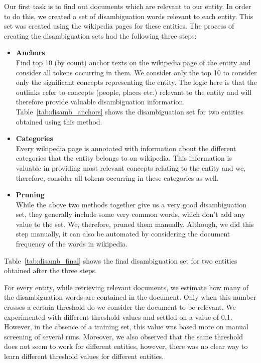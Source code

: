 Our first task is to find out documents which are relevant to our entity. In order to do this, we created a set of disambiguation words relevant to each entity. This set was created using the wikipedia pages for these entities. The process of creating the disambiguation sets had the following three steps:
\begin{itemize}
\item \textbf{Anchors} \\
Find top 10 (by count) anchor texts on the wikipedia page of the entity and consider all tokens occurring in them. We consider only the top 10 to consider only the significant concepts representing the entity. The logic here is that the outlinks refer to concepts (people, places etc.) relevant to the entity and will therefore provide valuable disambiguation information. Table~\ref{tab:disamb_anchors} shows the disambiguation set for two entities obtained using this method.
\item \textbf{Categories} \\
Every wikipedia page is annotated with information about the different categories that the entity belongs to on wikipedia. This information is valuable in providing most relevant concepts relating to the entity and we, therefore, consider all tokens occurring in these categories as well.
\item \textbf{Pruning} \\ 
While the above two methods together give us a very good disambiguation set, they generally include some very common words, which don’t add any value to the set. We, therefore, pruned them manually. Although, we did this step manually, it can also be automated by considering the document frequency of the words in wikipedia. 
\end{itemize}	
Table~\ref{tab:disamb_final} shows the final disambiguation set for two entities obtained after the three steps.
 
For every entity, while retrieving relevant documents, we estimate how many of the disambiguation words are contained in the document. Only when this number crosses a certain threshold do we consider the document to be relevant. We experimented with different threshold values and settled on a value of 0.1. However, in the absence of a training set, this value was based more on manual screening of several runs. Moreover, we also observed that the same threshold does not seem to work for different entities, however, there was no clear way to learn different threshold values for different entities.

